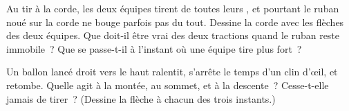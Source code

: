 \begin{exercise}[$\star\star$]\label{exo:g2:pushes-and-pulls:9}
Au tir à la corde, les deux équipes tirent de toutes leurs , et
pourtant le ruban noué sur la corde ne bouge parfois pas du tout.
Dessine la corde avec les flèches des deux équipes. Que doit-il être
vrai des deux tractions quand le ruban reste immobile~? Que se
passe-t-il à l'instant où une équipe tire plus fort~?
\end{exercise}

\begin{exercise}[$\star\star$]\label{exo:g2:pushes-and-pulls:10}
Un ballon lancé droit vers le haut ralentit, s'arrête le temps d'un
clin d'œil, et retombe. Quelle  agit à la montée, au sommet, et
à la descente~? Cesse-t-elle jamais de tirer~? (Dessine la flèche à
chacun des trois instants.)
\end{exercise}
